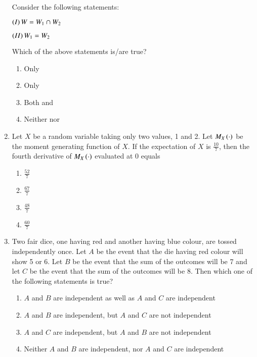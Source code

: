 \documentclass[journal]{IEEEtran}
\numberwithin{equation}{enumi}
\numberwithin{figure}{enumi}
\begin{document}
\begin{enumerate}
Consider the following statements:

$\left(I\right) W = W_1 \cap W_2$

$\left(II\right) W_1 = W_2$

Which of the above statements is/are true?

\begin{enumerate}[label=\brak{\Alph*}]
\item Only 

\item Only 

\item Both  and 

\item Neither  nor 
\end{enumerate}

\item Let $X$ be a random variable taking only two values, 1 and 2. Let $M_X\left(\cdot\right)$ be the moment generating function of $X$. If the expectation of $X$ is $\frac{10}{7}$, then the fourth derivative of $M_X\left(\cdot\right)$ evaluated at 0 equals

\begin{enumerate}
    \item $\frac{52}{7}$
    \item $\frac{67}{7}$
    \item $\frac{48}{7}$
    \item $\frac{60}{7}$
\end{enumerate}

\item Two fair dice, one having red and another having blue colour, are tossed independently once. Let $A$ be the event that the die having red colour will show 5 or 6. Let $B$ be the event that the sum of the outcomes will be 7 and let $C$ be the event that the sum of the outcomes will be 8. Then which one of the following statements is true?

\begin{enumerate}
    \item $A$ and $B$ are independent as well as $A$ and $C$ are independent
    \item $A$ and $B$ are independent, but $A$ and $C$ are not independent
    \item $A$ and $C$ are independent, but $A$ and $B$ are not independent
    \item Neither $A$ and $B$ are independent, nor $A$ and $C$ are independent
\end{enumerate}


\end{enumerate}
\end{document}
